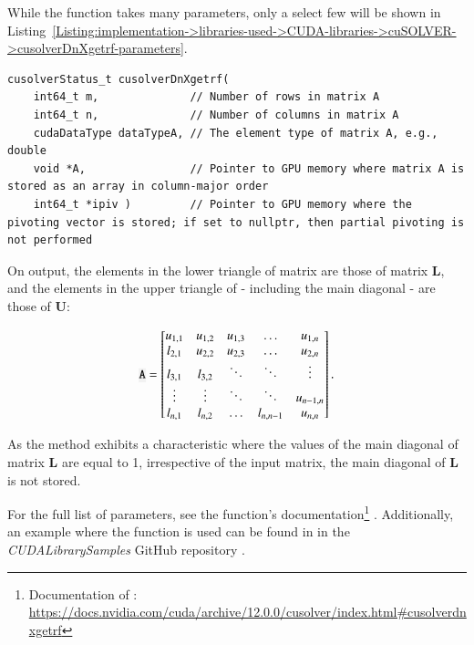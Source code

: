 While the  function takes many parameters, only a select few will be shown in Listing~\ref{Listing:implementation->libraries-used->CUDA-libraries->cuSOLVER->cusolverDnXgetrf-parameters}.

\begin{lstlisting}[caption={The function declaration of \code{cusolverDnXgetrf()} with a selection of parameters.},label={Listing:implementation->libraries-used->CUDA-libraries->cuSOLVER->cusolverDnXgetrf-parameters}]
cusolverStatus_t cusolverDnXgetrf(
	int64_t m,              // Number of rows in matrix A
	int64_t n,              // Number of columns in matrix A
	cudaDataType dataTypeA, // The element type of matrix A, e.g., double
	void *A,                // Pointer to GPU memory where matrix A is stored as an array in column-major order
	int64_t *ipiv )         // Pointer to GPU memory where the pivoting vector is stored; if set to nullptr, then partial pivoting is not performed
\end{lstlisting}

On output, the elements in the lower triangle of matrix  are those of matrix $\mathbf{L}$, and the elements in the upper triangle of  - including the main diagonal - are those of $\mathbf{U}$:

\begin{equation}
	\code{A} = {
		\begin{bmatrix}
			u _{1,1} & u _{1,2} & u _{1,3} & \ldots    & u _{1,n}   \\
			l_{2,1}	 & u _{2,2} & u _{2,3} & \ldots    & u _{2,n}   \\
			l_{3,1}  & l_{3,2} 	& \ddots   & \ddots    & \vdots 	 \\
			\vdots   & \vdots	& \ddots   & \ddots    & u _{n-1,n} \\
			l_{n,1}	 & l_{n,2}	& \ldots   & l_{n,n-1} & u _{n,n}
		\end{bmatrix}
	} \,.
	\label{Equation:implementation->libraries-used->CUDA-libraries->cuSOLVER->matrix-A-format}
\end{equation}

As the method exhibits a characteristic where the values of the main diagonal of matrix $\mathbf{L}$ are equal to 1, irrespective of the input matrix, the main diagonal of $\mathbf{L}$ is not stored.

For the full list of parameters, see the function's documentation\footnote{Documentation of : \url{https://docs.nvidia.com/cuda/archive/12.0.0/cusolver/index.html\#cusolverdnxgetrf}} \cite{5D33zKi5iStCty0r}. Additionally, an example where the  function is used can be found in  in the \textit{CUDALibrarySamples} GitHub repository \cite{Nicely2023}.

